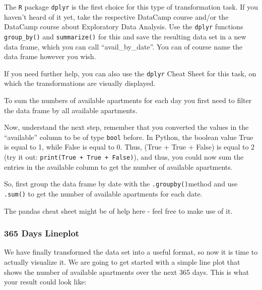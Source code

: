 \documentclass[
  11pt,
]{article}
\newenvironment{tips}[1]
  {
  \begin{itemize}
  \footnotesize
  \renewcommand{\labelitemi}{
    \raisebox{-.7\height}[0pt][0pt]{
      {\setkeys{Gin}{width=3em,keepaspectratio}
        \texttt{[image: images/\#1.png]}}
    }
  }
  \setlength{\fboxsep}{1em}
  \begin{rbox}
  \item
  }
  {
  \end{rbox}
  \end{itemize}
  }
\newenvironment{tipsp}[1]
  {
  \begin{itemize}
  \footnotesize
  \renewcommand{\labelitemi}{
    \raisebox{-.7\height}[0pt][0pt]{
      {\setkeys{Gin}{width=3em,keepaspectratio}
        \texttt{[image: images/\#1.png]}}
    }
  }
  \setlength{\fboxsep}{1em}
  \begin{pbox}
  \item
  }
  {
  \end{pbox}
  \end{itemize}
  }
\begin{document}
\begin{tips}r

The \texttt{R} package \texttt{dplyr} is the first choice for this type of transformation task. If you haven't heard of it yet, take the respective DataCamp course and/or the DataCamp course about Exploratory Data Analysis. Use the \texttt{dplyr} functions \texttt{group\_by()} and \texttt{summarize()} for this and save the resulting data set in a new data frame, which you can call ``avail\_by\_date''. You can of course name the data frame however you wish.

If you need further help, you can also use the \texttt{dplyr} Cheat Sheet for this task, on which the transformations are visually displayed.

\end{tips}

\begin{tipsp}p

To sum the numbers of available apartments for each day you first need to filter the data frame by all available apartments.

Now, understand the next step, remember that you converted the values in the ``available'' column to be of type \texttt{bool} before. In Python, the boolean value True is equal to 1, while False is equal to 0. Thus, (True + True + False) is equal to 2 (try it out: \texttt{print(True\ +\ True\ +\ False)}), and thus, you could now sum the entries in the available column to get the number of available apartments.

So, first group the data frame by date with the \texttt{.groupby()}method and use \texttt{.sum()} to get the number of available apartments for each date.

The pandas cheat sheet might be of help here - feel free to make use of it.

\end{tipsp}

\hypertarget{days-lineplot}{%
\subsubsection{365 Days Lineplot}\label{days-lineplot}}

We have finally transformed the data set into a useful format, so now it is time to actually visualize it. We are going to get started with a simple line plot that shows the number of available apartments over the next 365 days. This is what your result could look like:
\end{document}
